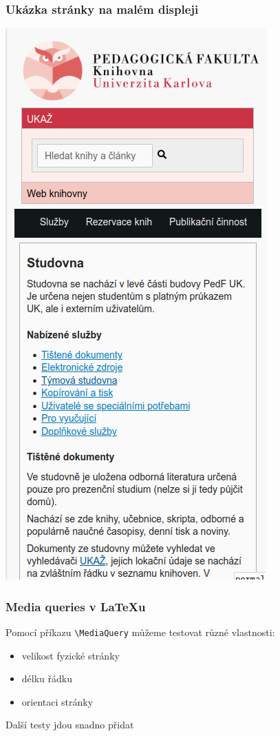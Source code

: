 \begin{frame}
  \frametitle{Ukázka stránky na malém displeji}
  \begin{center}
    \includegraphics[height=.9\textheight]{img/pedf-web-small.png}
  \end{center}
\end{frame}

\begin{frame}[fragile]
  \frametitle{Media queries v \LaTeX u}
    Pomocí příkazu \verb|\MediaQuery| můžeme testovat různé vlastnosti:
  
    \begin{itemize}
  \item velikost fyzické stránky
  \item délku řádku
  \item orientaci stránky
\end{itemize}

Další testy jdou snadno přidat

\end{frame}

